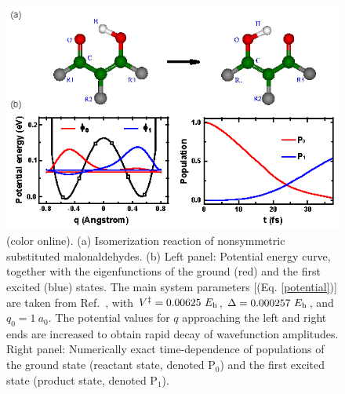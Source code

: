 \documentclass[prl,twocolumn,showpacs]{revtex4}
\begin{document}
\begin{figure}[htb]
\begin{center}
\includegraphics[width= 0.95\columnwidth]{fig1.eps}
\end{center}
\setlength{\abovecaptionskip}{-0.35cm}
\caption{\footnotesize{(color online). (a) Isomerization reaction of nonsymmetric substituted malonaldehydes.
(b) Left panel: Potential energy curve, together with the eigenfunctions of
    the ground (red) and the first excited (blue) states.
    The main system parameters [(Eq. \ref{potential})] are taken from Ref.\ \cite{hsubway}, with
    $V^\ddag=0.00625\ E_{\rm h}$, $\Delta=0.000257\ E_{\rm h}$, and $q_0=1\ a_0$.
    The potential values for $q$ approaching the left and right ends
are increased to obtain  rapid decay of wavefunction amplitudes.
    Right panel: Numerically exact time-dependence of populations of the ground state (reactant state, denoted P$_0$) and the first excited state
    (product state, denoted P$_1$).}}\label{fig1}
\end{figure}




\end{document}
